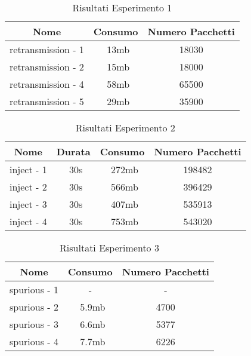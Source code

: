 \begin{table}[h!]
    \centering
    \caption*{Risultati Esperimento 1}
    \begin{tabular}{|c|c|c|}
        \hline
        \textbf{Nome} & \textbf{Consumo} & \textbf{Numero Pacchetti} \\
        \hline
        retransmission - 1 & ~13mb & 18030 \\
        \hline
        retransmission - 2 & ~15mb & 18000 \\
        \hline
        retransmission - 4 & ~58mb & 65500 \\
        \hline
        retransmission - 5 & ~29mb & 35900 \\
        \hline
    \end{tabular}
\end{table}

\begin{table}[h!]
    \centering
    \caption*{Risultati Esperimento 2}
    \begin{tabular}{|c|c|c|c|}
        \hline
        \textbf{Nome} & \textbf{Durata} & \textbf{Consumo} & \textbf{Numero Pacchetti} \\
        \hline
        inject - 1 & ~30s & ~272mb & 198482 \\
        \hline
        inject - 2 & ~30s & ~566mb & 396429 \\
        \hline
        inject - 3 & ~30s & ~407mb & 535913 \\
        \hline
        inject - 4 & ~30s & ~753mb & 543020 \\
        \hline
    \end{tabular}
\end{table}

\begin{table}[h!]
    \centering
    \caption*{Risultati Esperimento 3}
    \begin{tabular}{|c|c|c|}
        \hline
        \textbf{Nome} & \textbf{Consumo} & \textbf{Numero Pacchetti} \\
        \hline
        spurious - 1 & - & - \\
        \hline
        spurious - 2 & ~5.9mb & 4700 \\
        \hline
        spurious - 3 & ~6.6mb & 5377 \\
        \hline
        spurious - 4 & ~7.7mb & 6226 \\
        \hline
    \end{tabular}
\end{table}

